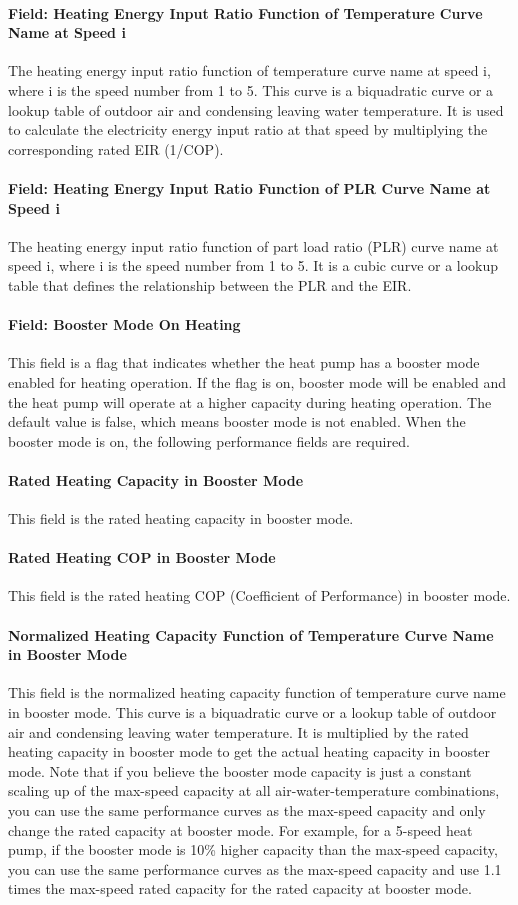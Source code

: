 \paragraph{Field: Heating Energy Input Ratio Function of Temperature Curve Name
at Speed i} The heating energy input ratio function of temperature curve name at
speed i, where i is the speed number from 1 to 5. This curve is a biquadratic
curve or a lookup table of outdoor air and condensing leaving water temperature.
It is used to calculate the electricity energy input ratio at that speed by
multiplying the corresponding rated EIR (1/COP).
\paragraph{Field: Heating Energy Input Ratio Function of PLR Curve Name at Speed
i} The heating energy input ratio function of part load ratio (PLR) curve name
at speed i, where i is the speed number from 1 to 5. It is a cubic curve or a
lookup table that defines the relationship between the PLR and the EIR.
\paragraph{Field: Booster Mode On Heating} This field is a flag that indicates
whether the heat pump has a booster mode enabled for heating operation. If the
flag is on, booster mode will be enabled and the heat pump will operate at a
higher capacity during heating operation. The default value is false, which
means booster mode is not enabled. When the booster mode is on, the following
performance fields are required.
\paragraph{Rated Heating Capacity in Booster Mode} This field is the rated
heating capacity in booster mode.
\paragraph{Rated Heating COP in Booster Mode} This field is the rated heating
COP (Coefficient of Performance) in booster mode.
\paragraph{Normalized Heating Capacity Function of Temperature Curve Name in
Booster Mode} This field is the normalized heating capacity function of
temperature curve name in booster mode. This curve is a biquadratic curve or a
lookup table of outdoor air and condensing leaving water temperature. It is
multiplied by the rated heating capacity in booster mode to get the actual
heating capacity in booster mode. Note that if you believe the booster mode
capacity is just a constant scaling up of the max-speed capacity at all
air-water-temperature combinations, you can use the same performance curves as
the max-speed capacity and only change the rated capacity at booster mode.
For example, for a 5-speed heat pump, if the booster mode is 10\% higher capacity
than the max-speed capacity, you can use the same performance curves as the max-speed
capacity and use 1.1 times the max-speed rated capacity for the rated capacity at booster mode.
